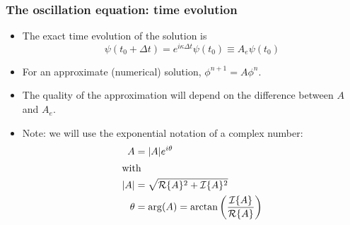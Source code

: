 \documentclass[aspectratio=149,9pt]{beamer}
\begin{document}
\begin{frame}
	\frametitle{The oscillation equation: time evolution}
	\begin{itemize}
		\item The exact time evolution of the solution is
			\begin{equation*}
				\psi (t_0 +\Delta t) = e^{i \kappa \Delta t} \psi (t_0) \equiv A_e \psi (t_0)
			\end{equation*}\vspace*{2ex}
		\item For an approximate (numerical) solution, $\phi^{n+1} = A \phi^n$.\vspace*{3ex}
		\item The quality of the approximation will depend on the difference between $A$ and $A_e$.\vspace*{3ex}
		\item Note: we will use the exponential notation of a complex number:
			\begin{align*}
				A & =|A| e^{i \theta}\\
			\intertext{with}
				| A | & = \sqrt{ \mathcal R \{ A \}^2 + \mathcal I \{ A \}^2 } \\
				\theta & = \arg(A)=\arctan \left(\frac{{\cal I}\{ A \}}{{\cal R}\{ A \}}\right)
			\end{align*}
	\end{itemize}
\end{frame}
%
%
%
\end{document}
